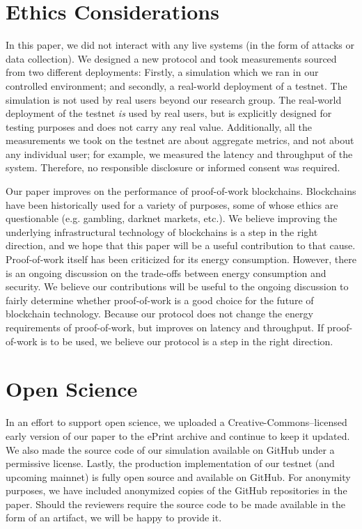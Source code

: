 \section{Ethics Considerations}

In this paper, we did not interact with any live systems (in the form of attacks or data collection).
We designed a new protocol and took measurements sourced from two different deployments: Firstly,
a simulation which we ran in our controlled environment; and secondly, a real-world deployment of
a testnet. The simulation is not used by real users beyond our research group. The real-world deployment
of the testnet \emph{is} used by real users, but is explicitly designed for testing purposes and does
not carry any real value. Additionally, all the measurements we took on the testnet are about aggregate
metrics, and not about any individual user; for example, we measured the latency and throughput of the
system. Therefore, no responsible disclosure or informed consent was required.

Our paper improves on the performance of proof-of-work blockchains. Blockchains have been historically used
for a variety of purposes, some of whose ethics are questionable (e.g. gambling, darknet markets, etc.).
We believe improving the underlying infrastructural technology of blockchains is a step in the right direction,
and we hope that this paper will be a useful contribution to that cause. Proof-of-work itself has been criticized
for its energy consumption. However, there is an ongoing discussion on the trade-offs between energy consumption
and security. We believe our contributions will be useful to the ongoing discussion to fairly determine whether
proof-of-work is a good choice for the future of blockchain technology. Because our protocol does not change the
energy requirements of proof-of-work, but improves on latency and throughput. If proof-of-work is to be used,
we believe our protocol is a step in the right direction.

\section{Open Science}

In an effort to support open science, we uploaded a Creative-Commons--licensed early version of our paper to the
ePrint archive and continue to keep it updated. We also made the source code of our simulation available on
GitHub under a permissive license. Lastly, the production implementation of our testnet (and upcoming mainnet)
is fully open source and available on GitHub. For anonymity purposes, we have included anonymized copies of
the GitHub repositories in the paper. Should the reviewers require the source code to be made available in
the form of an artifact, we will be happy to provide it.
